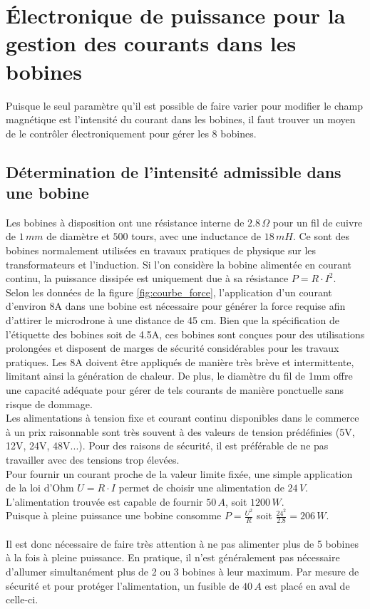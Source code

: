\documentclass{article}
\begin{document}
\section{Électronique de puissance pour la gestion des courants dans les bobines}
Puisque le seul paramètre qu'il est possible de faire varier pour modifier le champ magnétique est l'intensité du courant dans les bobines, il faut trouver un moyen de le contrôler électroniquement pour gérer les 8 bobines. 

\subsection{Détermination de l'intensité admissible dans une bobine}

Les bobines à disposition ont une résistance interne de $2.8 \, \Omega$ pour un fil de cuivre de $1\,mm$ de diamètre et $500$ tours, avec une inductance de $18\, mH$. Ce sont des bobines normalement utilisées en travaux pratiques de physique sur les transformateurs et l'induction. Si l'on considère la bobine alimentée en courant continu, la puissance dissipée est uniquement due à sa résistance $P=R\cdot I^2$.
\\
Selon les données de la figure \ref{fig:courbe_force}, l'application d'un courant d'environ 8A dans une bobine est nécessaire pour générer la force requise afin d'attirer le microdrone à une distance de 45 cm. Bien que la spécification de l'étiquette des bobines soit de 4.5A, ces bobines sont conçues pour des utilisations prolongées et disposent de marges de sécurité considérables pour les travaux pratiques. Les 8A doivent être appliqués de manière très brève et intermittente, limitant ainsi la génération de chaleur. De plus, le diamètre du fil de 1mm offre une capacité adéquate pour gérer de tels courants de manière ponctuelle sans risque de dommage.
\\
Les alimentations à tension fixe et courant continu disponibles dans le commerce à un prix raisonnable sont très souvent à des valeurs de tension prédéfinies (5V, 12V, 24V, 48V...). Pour des raisons de sécurité, il est préférable de ne pas travailler avec des tensions trop élevées.\\Pour fournir un courant proche de la valeur limite fixée, une simple application de la loi d'Ohm $U=R\cdot I$ permet de choisir une alimentation de $24 \,V$. L'alimentation trouvée est capable de fournir $50 \,A$, soit $1200 \,W$. \\Puisque à pleine puissance une bobine consomme $P=\frac{U^2}{R}$ soit $\frac{24^2}{2.8} = 206 \,W$.
\\\\
Il est donc nécessaire de faire très attention à ne pas alimenter plus de 5 bobines à la fois à pleine puissance. En pratique, il n'est généralement pas nécessaire d'allumer simultanément plus de 2 ou 3 bobines à leur maximum. Par mesure de sécurité et pour protéger l'alimentation, un fusible de $40\,A$ est placé en aval de celle-ci.
\end{document}
